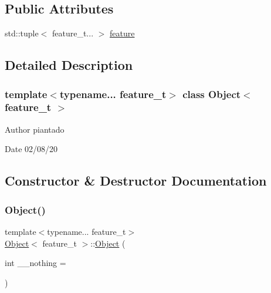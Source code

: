 \subsection*{Public Attributes}
\begin{DoxyCompactItemize}
\item 
std\+::tuple$<$ feature\+\_\+t... $>$ \hyperlink{struct_object_a13175d047537123b71456580cae61dee}{feature}
\end{DoxyCompactItemize}


\subsection{Detailed Description}
\subsubsection*{template$<$typename... feature\+\_\+t$>$\newline
class Object$<$ feature\+\_\+t $>$}

\begin{DoxyAuthor}{Author}
piantado 
\end{DoxyAuthor}
\begin{DoxyDate}{Date}
02/08/20 
\end{DoxyDate}


\subsection{Constructor \& Destructor Documentation}
\mbox{\label{struct_object_a98d515d0ebefa2a49ea148d3d2b0de72}} 
\subsubsection{\texorpdfstring{Object()}{Object()}\hspace{0.1cm}{\footnotesize\ttfamily [1/2]}}
{\footnotesize\ttfamily template$<$typename... feature\+\_\+t$>$ \\
\hyperlink{struct_object}{Object}$<$ feature\+\_\+t $>$\+::\hyperlink{struct_object}{Object} (\begin{DoxyParamCaption}\item[{int}]{\+\_\+\+\_\+nothing = {} }\end{DoxyParamCaption})\hspace{0.3cm}{\ttfamily [inline]}}

